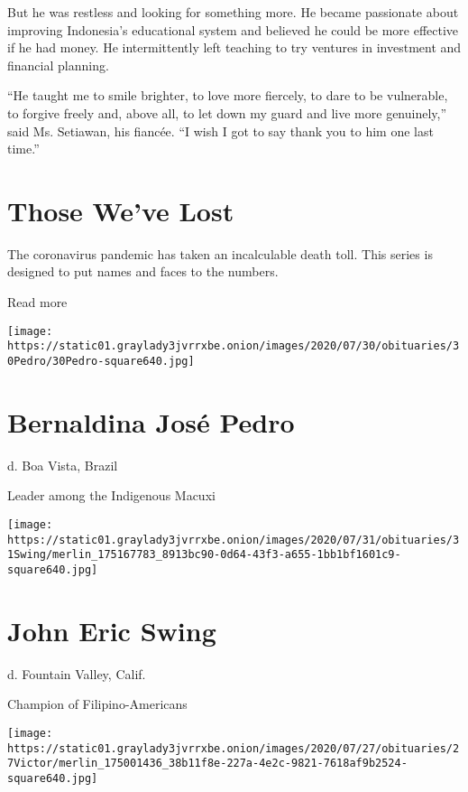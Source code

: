 But he was restless and looking for something more. He became passionate
about improving Indonesia's educational system and believed he could be
more effective if he had money. He intermittently left teaching to try
ventures in investment and financial planning.

``He taught me to smile brighter, to love more fiercely, to dare to be
vulnerable, to forgive freely and, above all, to let down my guard and
live more genuinely,'' said Ms. Setiawan, his fiancée. ``I wish I got to
say thank you to him one last time.''

\href{https://www.nytimes3xbfgragh.onion/interactive/2020/obituaries/people-died-coronavirus-obituaries.html?action=click\&pgtype=Article\&state=default\&region=BELOW_MAIN_CONTENT\&context=covid_obits_promo}{}

\hypertarget{those-weve-lost}{%
\section{Those We've Lost}\label{those-weve-lost}}

The coronavirus pandemic has taken an incalculable death toll. This
series is designed to put names and faces to the numbers.

Read more

\texttt{[image: https://static01.graylady3jvrrxbe.onion/images/2020/07/30/obituaries/30Pedro/30Pedro-square640.jpg]}

\hypertarget{bernaldina-josuxe9-pedro}{%
\section{Bernaldina José Pedro}\label{bernaldina-josuxe9-pedro}}

d. Boa Vista, Brazil

Leader among the Indigenous Macuxi

\texttt{[image: https://static01.graylady3jvrrxbe.onion/images/2020/07/31/obituaries/31Swing/merlin\_175167783\_8913bc90-0d64-43f3-a655-1bb1bf1601c9-square640.jpg]}

\hypertarget{john-eric-swing}{%
\section{John Eric Swing}\label{john-eric-swing}}

d. Fountain Valley, Calif.

Champion of Filipino-Americans

\texttt{[image: https://static01.graylady3jvrrxbe.onion/images/2020/07/27/obituaries/27Victor/merlin\_175001436\_38b11f8e-227a-4e2c-9821-7618af9b2524-square640.jpg]}

